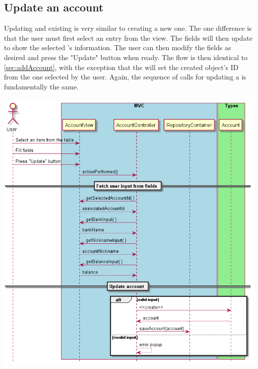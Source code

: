 \documentclass[12pt]{article}
\begin{document}
\subsection{Update an account}
Updating and existing  is very similar to creating a new one. The one difference is that the user must first select an entry from the view. The fields will then update to show the selected 's information. The user can then modify the fields as desired and press the "Update" button when ready. The flow is then identical to \ref{sec:addAccount}, with the exception that the  will set the created  object's ID from the one selected by the user. Again, the sequence of calls for updating a  is fundamentally the same.\\
\\
\includegraphics[width=\textwidth,height=\textheight,keepaspectratio]{diagrams/sequence/updateAccount.png}
\bigskip
\end{document}
